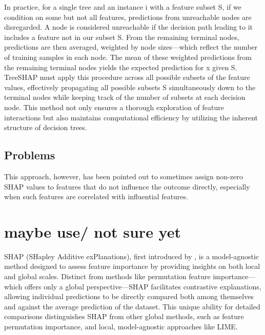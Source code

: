 \documentclass[12pt]{article}
\begin{document}
In practice, for a single tree and an instance i with a feature subset 
S, if we condition on some but not all features, predictions from unreachable nodes are disregarded. A node is considered unreachable if the decision path leading to it includes a feature not in our subset 
S.  From the remaining terminal nodes, predictions are then averaged, weighted by node sizes—which reflect the number of training samples in each node. The mean of these weighted predictions from the remaining terminal nodes yields the expected prediction for x given S.
TreeSHAP must apply this procedure across all possible subsets of the feature values, effectively propagating all possible subsets 
S simultaneously down to the terminal nodes while keeping track of the number of subsets at each decision node. This method not only ensures a thorough exploration of feature interactions but also maintains computational efficiency by utilizing the inherent structure of decision trees.
\subsection{Problems}
This approach, however, has been pointed out to sometimes assign non-zero SHAP values to features that do not influence the outcome directly, especially when such features are correlated with influential features.


















\section{maybe use/ not sure yet}

	SHAP (SHapley Additive exPlanations), first introduced by \cite{10.5555/3295222.3295230}, is a model-agnostic method designed to assess feature importance by providing insights on both local and global scales. Distinct from methods like permutation feature importance—which offers only a global perspective—SHAP facilitates contrastive explanations, allowing individual predictions to be directly compared both among themselves and against the average prediction of the dataset. This unique ability for detailed comparisons distinguishes SHAP from other global methods, such as feature permutation importance, and local, model-agnostic approaches like LIME.
	
\end{document}
